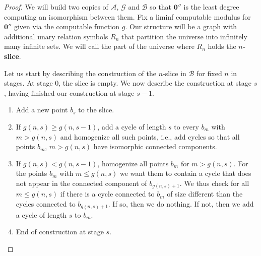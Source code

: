 \documentclass[10pt,a4paper]{amsart}
\newcommand\+[1]{\mathcal{#1}}
\renewcommand\*[1]{\mathbf{#1}}
\renewcommand\=[1]{\text{#1}}
\renewcommand\*[1]{\mathbf{#1}}
\newcommand{\A}{\mathcal{A}}
\newcommand{\B}{\mathcal{B}}
\newcommand{\mc}[1]{\mathcal{#1}}
\newcommand{\define}[1]{\textbf{#1}}
\begin{document}
 \begin{proof}
   We will build two copies of $\A$, $\mc G$ and $\B$ so that $\mathbf 0''$ is the least degree computing an isomorphism between them. Fix a liminf computable modulus for $\mathbf 0''$ given via the computable function $g$. Our structure will be a graph with additional unary relation symbols $R_n$ that partition the universe into infinitely many infinite sets. We will call the part of the universe where $R_n$ holds the \define{$n$-slice}.

   Let us start by describing the construction of the $n$-slice in $\B$ for fixed $n$ in stages.
   At stage $0$, the slice is empty. We now describe the construction at stage $s$, having finished our construction at stage $s-1$.
   \begin{enumerate}
     \item Add a new point $b_s$ to the slice.
     \item If $g(n,s)\geq g(n,s-1)$, add a cycle of length $s$ to every $b_m$ with $m>g(n,s)$ and homogenize all such points, i.e., add cycles so that all points $b_m$, $m>g(n,s)$ have isomorphic connected components.
     \item If $g(n,s)<g(n,s-1)$, homogenize all points $b_m$ for $m>g(n,s)$. For the points $b_m$ with $m\leq g(n,s)$ we want them to contain a cycle that does not appear in the connected component of $b_{g(n,s)+1}$. We thus check for all $m\leq g(n,s)$ if there is a cycle connected to $b_m$ of size different than the cycles connected to $b_{g(n,s)+1}$. If so, then we do nothing. If not, then we add a cycle of length $s$ to $b_m$.
     \item End of construction at stage $s$.
   \end{enumerate}


\end{proof}
\end{document}
